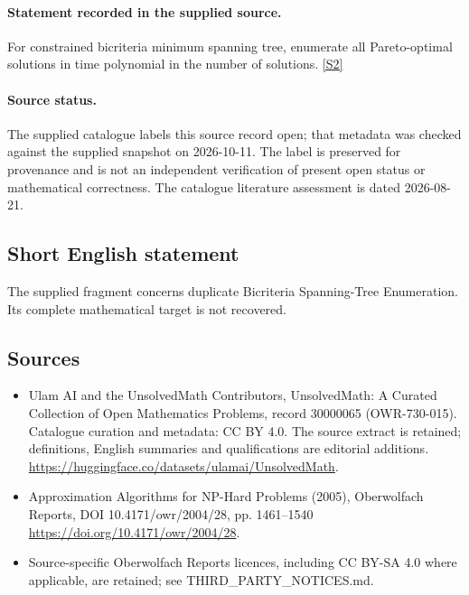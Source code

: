 \documentclass[11pt]{article}
\newcommand{\sref}[2]{\hyperlink{source:#1:#2}{[S#2]}}
\begin{document}
\paragraph{Statement recorded in the supplied source.}
For constrained bicriteria minimum spanning tree, enumerate all Pareto-optimal solutions in time polynomial in the number of solutions. \sref{30000065}{2}
\paragraph{Source status.}
The supplied catalogue labels this source record open; that metadata was checked against the supplied snapshot on 2026-10-11. The label is preserved for provenance and is not an independent verification of present open status or mathematical correctness. The catalogue literature assessment is dated 2026-08-21.
\subsection{Short English statement}
The supplied fragment concerns duplicate Bicriteria Spanning-Tree Enumeration. Its complete mathematical target is not recovered.
\subsection{Sources}
\begin{itemize}
\item[\hypertarget{source:30000065:1}{S1}] Ulam AI and the UnsolvedMath Contributors, UnsolvedMath: A Curated Collection of Open Mathematics Problems, record 30000065 (OWR-730-015). Catalogue curation and metadata: CC BY 4.0. The source extract is retained; definitions, English summaries and qualifications are editorial additions.
\url{https://huggingface.co/datasets/ulamai/UnsolvedMath}.
\item[\hypertarget{source:30000065:2}{S2}] Approximation Algorithms for NP-Hard Problems (2005), Oberwolfach Reports, DOI 10.4171/owr/2004/28, pp. 1461--1540
\url{https://doi.org/10.4171/owr/2004/28}.
\item Source-specific Oberwolfach Reports licences, including CC BY-SA 4.0 where applicable, are retained; see THIRD\_PARTY\_NOTICES.md.
\end{itemize}
\end{document}
